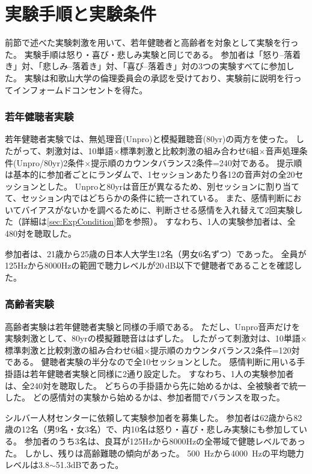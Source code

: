 \section{実験手順と実験条件}
\label{sec:ExpCondition_Calm}
前節で述べた実験刺激を用いて、若年健聴者と高齢者を対象として実験を行った。
実験手順は怒り・喜び・悲しみ実験と同じである。
参加者は「怒り--落着き」対、「悲しみ--落着き」対、「喜び--落着き」対の3つの実験すべてに参加した。
実験は和歌山大学の倫理委員会の承認を受けており、実験前に説明を行ってインフォームドコンセントを得た。


\subsubsection{若年健聴者実験}

若年健聴者実験では、無処理音(Unpro)と模擬難聴音(80yr)の両方を使った。
したがって、刺激対は、10単語$\times$標準刺激と比較刺激の組み合わせ6組$\times$音声処理条件(Unpro/80yr)2条件$\times$提示順のカウンタバランス2条件=240対である。
提示順は基本的に参加者ごとにランダムで、1セッションあたり各12の音声対の全20セッションとした。
Unproと80yrは音圧が異なるため、別セッションに割り当てて、セッション内ではどちらかの条件に統一されている。
また、感情判断においてバイアスがないかを調べるために、判断させる感情を入れ替えて2回実験した（詳細は\ref{sec:ExpCondition}節を参照）。
すなわち、1人の実験参加者は、全480対を聴取した。

参加者は、21歳から25歳の日本人大学生12名（男女6名ずつ）であった。
全員が125Hzから8000Hzの範囲で聴力レベルが20\,dB以下で健聴者であることを確認した。


\subsubsection{高齢者実験}
高齢者実験は若年健聴者実験と同様の手順である。
ただし、Unpro音声だけを実験刺激として、80yrの模擬難聴音ははずした。
したがって刺激対は、10単語$\times$標準刺激と比較刺激の組み合わせ6組$\times$提示順のカウンタバランス2条件=120対である。
健聴者実験の半分なので全10セッションとした。
感情判断に用いる手掛語は若年健聴者実験と同様に2通り設定した。
すなわち、1人の実験参加者は、全240対を聴取した。
どちらの手掛語から先に始めるかは、全被験者で統一した。
どの感情対の実験から始めるかは、参加者間でバランスを取った。

シルバー人材センターに依頼して実験参加者を募集した。
参加者は62歳から82歳の12名（男9名・女3名）で、内10名は怒り・喜び・悲しみ実験にも参加している。
参加者のうち3名は、良耳が125Hzから8000Hzの全帯域で健聴レベルであった。
しかし、残りは高齢難聴の傾向があった。
500~Hzから4000~Hzの平均聴力レベルは3.8$\sim$51.3dBであった。


